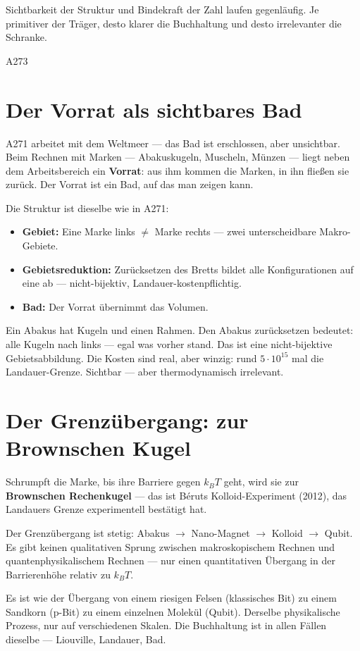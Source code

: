 \label{ch:rechenkugel}

\epigraph{Sichtbarkeit der Struktur und Bindekraft der Zahl laufen
gegenläufig. Je primitiver der Träger, desto klarer die Buchhaltung
und desto irrelevanter die Schranke.}{A273}

\section{Der Vorrat als sichtbares Bad}

A271 arbeitet mit dem Weltmeer --- das Bad ist erschlossen, aber unsichtbar.
Beim Rechnen mit Marken --- Abakuskugeln, Muscheln, Münzen --- liegt neben
dem Arbeitsbereich ein \textbf{Vorrat}: aus ihm kommen die Marken, in ihn
fließen sie zurück. Der Vorrat ist ein Bad, auf das man zeigen kann.

Die Struktur ist dieselbe wie in A271: 
\begin{itemize}
  \item \textbf{Gebiet:} Eine Marke links $\neq$ Marke rechts ---
    zwei unterscheidbare Makro-Gebiete.
  \item \textbf{Gebietsreduktion:} Zurücksetzen des Bretts bildet alle
    Konfigurationen auf eine ab --- nicht-bijektiv, Landauer-kostenpflichtig.
  \item \textbf{Bad:} Der Vorrat übernimmt das Volumen.
\end{itemize}

\begin{laierspur}
Ein Abakus hat Kugeln und einen Rahmen. Den Abakus zurücksetzen bedeutet:
alle Kugeln nach links --- egal was vorher stand. Das ist eine
nicht-bijektive Gebietsabbildung. Die Kosten sind real, aber winzig:
rund $5 \cdot 10^{15}$ mal die Landauer-Grenze. Sichtbar --- aber
thermodynamisch irrelevant.
\end{laierspur}

\section{Der Grenzübergang: zur Brownschen Kugel}

Schrumpft die Marke, bis ihre Barriere gegen $k_BT$ geht, wird sie zur
\textbf{Brownschen Rechenkugel} --- das ist Béruts Kolloid-Experiment
(2012), das Landauers Grenze experimentell bestätigt hat. 

Der Grenzübergang ist stetig: Abakus $\to$ Nano-Magnet $\to$ Kolloid
$\to$ Qubit. Es gibt keinen qualitativen Sprung zwischen makroskopischem
Rechnen und quantenphysikalischem Rechnen --- nur einen quantitativen
Übergang in der Barrierenhöhe relativ zu $k_BT$. 

\begin{laierspur}
Es ist wie der Übergang von einem riesigen Felsen (klassisches Bit) zu
einem Sandkorn (p-Bit) zu einem einzelnen Molekül (Qubit). Derselbe
physikalische Prozess, nur auf verschiedenen Skalen. Die Buchhaltung
ist in allen Fällen dieselbe --- Liouville, Landauer, Bad.
\end{laierspur}
